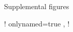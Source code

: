 
\ShowBackBib  %

\begin{Appendices}

\begin{Appendix}{Supplemental figures}
\end{Appendix}

\ShowListOfTheoremLike! {
    onlynamed=true ,
}
\ShowListOfSourceCode!
\end{Appendices}

\ShowIndex
